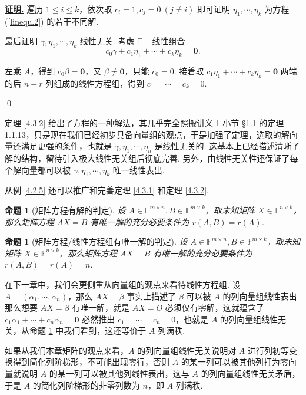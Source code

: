 \documentclass[10pt,openany]{article}
\theoremstyle{thmstyle} %
\theoremstyle{defstyle} %
\theoremstyle{prostyle} %
\newtheorem{proposition}[theorem]{命题}
\theoremstyle{exastyle}
\theoremstyle{remstyle}
\renewenvironment{proof}[1][证明]{\par\underline{\textbf{#1.}} \;\fangsong}{\qed\par}
\newcommand{\F}{\mathbb{F}}
\newcommand{\mn}{^{m \times n}}
\begin{document}
\begin{proof}
	遍历 \( 1 \leq i \leq k \)，依次取 \( c_i=1, c_j=0 \ (j \neq i) \) 即可证明 \( \eta_1,\cdots,\eta_k \) 为方程 (\ref{linequ.2}) 的若干不同解.
	
	{\color{blue} 最后证明 \( \gamma,\eta_1,\cdots,\eta_k \) 线性无关. 考虑 \( \F-\)线性组合
	\[ c_0\gamma+c_1\eta_1+\cdots+c_k\eta_k=\bm{0}. \]
	
	左乘 \( A \)，得到 \( c_0\beta=\bm{0} \)，又 \( \beta \neq \bm{0} \)，只能 \( c_0=0 \). 接着取 \( c_1\eta_1+\cdots+c_k\eta_k=\bm{0} \) 两端的后 \( n-r \) 列组成的线性方程组，得到 \( c_1=\cdots=c_k=0 \).}
\end{proof}

定理 \ref{4.3.2} 给出了方程的一种解法，其几乎完全照搬讲义 1 小节 \S 1.1 的定理 1.1.13，只是现在我们已经初步具备向量组的观点，于是加强了定理，选取的解向量还满足更强的条件，也就是 \( \gamma,\eta_1,\cdots,\eta_n \) 是线性无关的. 这基本上已经描述清晰了解的结构，留待引入极大线性无关组后彻底完善. 另外，由线性无关性还保证了每个解向量都可以被 \( \gamma,\eta_1,\cdots,\eta_k \) 唯一线性表出.

从例 \ref{4.2.5} 还可以推广和完善定理 \ref{4.3.1} 和定理 \ref{4.3.2}.

\begin{proposition}[矩阵方程有解的判定]
	设 \( A \in \F\mn, B \in \F^{m \times k} \)，取未知矩阵 \( X \in \F^{n \times k} \)，那么矩阵方程 \( AX=B \) 有唯一解的充分必要条件为 \( r(A,B)=r(A) \).
\end{proposition}

\begin{proposition}[矩阵方程/线性方程组有唯一解的判定] \label{4.3.4}
	设 \( A \in \F\mn, B \in \F^{m \times k} \)，取未知矩阵 \( X \in \F^{n \times k} \)，那么矩阵方程 \( AX=B \) 有唯一解的充分必要条件为 \( r(A,B)=r(A)=n \).
\end{proposition}

在下一章中，我们会更侧重从向量组的观点来看待线性方程组. 设 \( A=(\alpha_1,\cdots,\alpha_n) \)，那么 \( AX=\beta \) 事实上描述了 \( \beta \) 可以被 \( A \) 的列向量组线性表出. 那么想要 \( AX=\beta \) 有唯一解，就是 \( AX=O \) 必须仅有零解，这就蕴含了 \( c_1\alpha_1+\cdots+c_n\alpha_n=\bm{0} \) 必然推出 \( c_1=\cdots=c_n=0 \)，也就是 \( A \) 的列向量组线性无关，从命题 \ref{4.3.4} 中我们看到，这还等价于 \( A \) 列满秩.

如果从我们本章矩阵的观点来看，\( A \) 的列向量组线性无关说明对 \( A \) 进行列初等变换得到简化列阶梯形，不可能出现零行，否则 \( A \) 的某一列可以被其他列打为零向量就说明 \( A \) 的某一列可以被其他列线性表出，这与 \( A \) 的列向量组线性无关矛盾，于是 \( A \) 的简化列阶梯形的非零列数为 \( n \)，即 \( A \) 列满秩.
\end{document}

